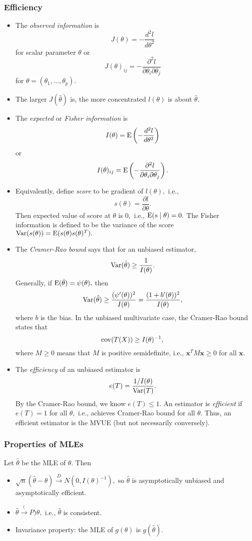 \subsubsection{Efficiency}
\begin{itemize}
	\item The \textit{observed information} is \[ J(\theta) = -\frac{d^2l}{d \theta^2} \] for scalar parameter $\theta$ or 
	\[ J(\theta)_{ij} = -\frac{\partial^2l}{\partial \theta_i \partial \theta_j} \] for $\theta = (\theta_1, \ldots, \theta_p).$
	\item The larger $J(\hat{\theta})$ is, the more concentrated $l(\theta)$ is about $\hat{\theta}.$
	\item The \textit{expected} or \textit{Fisher information} is \[ I(\theta) = \operatorname{E}\left(-\frac{d^2l}{d \theta^2}\right) \] or
	\[ I(\theta)_{ij} = \operatorname{E}\left(-\frac{\partial^2l}{\partial \theta_i \partial \theta_j}\right). \]
	\item Equivalently, define \textit{score} to be gradient of $l(\theta),$ i.e., \[ s(\theta) = \frac{\partial l}{\partial \theta}. \]
	Then expected value of score at $\theta$ is $0,$ i.e., $\operatorname{E}(s \mid \theta) = 0.$ The Fisher information is defined to be the variance of the score $\operatorname{Var}(s(\theta)) = \operatorname{E}(s(\theta)s(\theta)^T).$
	\item The \textit{Cramer-Rao bound} says that for an unbiased estimator, \[ \operatorname{Var}(\hat{\theta}) \geq \frac{1}{I(\theta)}. \]
	Generally, if $\operatorname{E}(\hat{\theta}) = \psi(\theta),$ then 
	\[ \operatorname{Var}(\hat{\theta}) \geq \frac{(\psi'(\theta))^2}{I(\theta)} = \frac{(1+b'(\theta))^2}{I(\theta)}, \] where $b$ is the bias. In the unbiased multivariate case, the Cramer-Rao bound states that 
	\[ \operatorname{cov}(T(X)) \geq I(\theta)^{-1}, \]
	where $M \geq 0$ means that $M$ is positive semidefinite, i.e., $\mathbf{x}^TM\mathbf{x} \geq 0$ for all $\mathbf{x}.$

	\item The \textit{efficiency} of an unbiased estimator is 
	\[ e(T) = \frac{1/I(\theta)}{\operatorname{Var}(T)}. \] By the Cramer-Rao bound, we know $e(T) \leq 1.$
	An estimator is \textit{efficient} if $e(T) = 1$ for all $\theta,$ i.e., achieves Cramer-Rao bound for all $\theta.$ Thus, an efficient estimator is the MVUE (but not necessarily conversely).
\end{itemize}

\subsubsection{Properties of MLEs}
Let $\hat{\theta}$ be the MLE of $\theta.$ Then
\begin{itemize}
	\item $\sqrt{n}(\hat\theta - \theta) \xrightarrow{D} N(0, I(\theta)^{-1}),$ so $\hat\theta$ is asymptotically unbiased and asymptotically efficient.
	\item $\hat\theta \xrightarrow(P) \theta,$ i.e., $\hat\theta$ is consistent.
	\item Invariance property: the MLE of $g(\theta)$ is $g(\hat\theta).$
\end{itemize}


